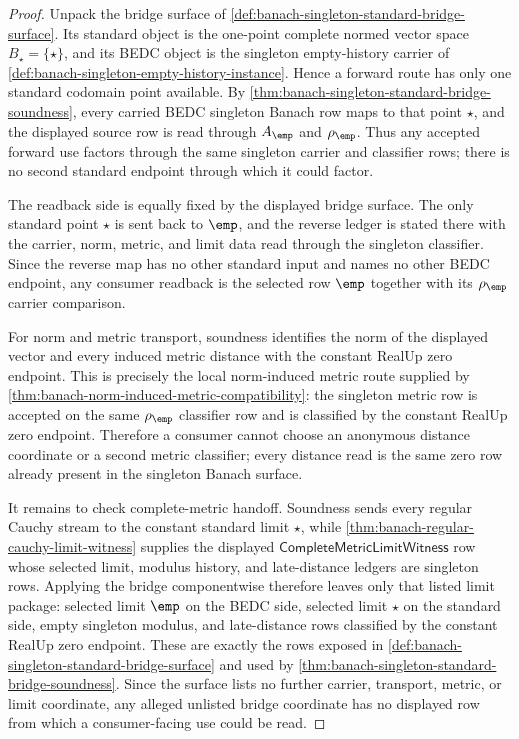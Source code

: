 \begin{proof}
Unpack the bridge surface of
\autoref{def:banach-singleton-standard-bridge-surface}. Its standard object is
the one-point complete normed vector space $B_{\star}=\{\star\}$, and its BEDC
object is the singleton empty-history carrier of
\autoref{def:banach-singleton-empty-history-instance}. Hence a forward route
has only one standard codomain point available. By
\autoref{thm:banach-singleton-standard-bridge-soundness}, every carried BEDC
singleton Banach row maps to that point $\star$, and the displayed source row is
read through $A_{\emp}$ and $\rho_{\emp}$. Thus any accepted forward use factors
through the same singleton carrier and classifier rows; there is no second
standard endpoint through which it could factor.

The readback side is equally fixed by the displayed bridge surface. The only
standard point $\star$ is sent back to $\emp$, and the reverse ledger is stated
there with the carrier, norm, metric, and limit data read through the singleton
classifier. Since the reverse map has no other standard input and names no
other BEDC endpoint, any consumer readback is the selected row $\emp$ together
with its $\rho_{\emp}$ carrier comparison.

For norm and metric transport, soundness identifies the norm of the displayed
vector and every induced metric distance with the constant RealUp zero endpoint.
This is precisely the local norm-induced metric route supplied by
\autoref{thm:banach-norm-induced-metric-compatibility}: the singleton metric row
is accepted on the same $\rho_{\emp}$ classifier row and is classified by the
constant RealUp zero endpoint. Therefore a consumer cannot choose an anonymous
distance coordinate or a second metric classifier; every distance read is the
same zero row already present in the singleton Banach surface.

It remains to check complete-metric handoff. Soundness sends every regular
Cauchy stream to the constant standard limit $\star$, while
\autoref{thm:banach-regular-cauchy-limit-witness} supplies the displayed
$\mathsf{CompleteMetricLimitWitness}$ row whose selected limit, modulus history,
and late-distance ledgers are singleton rows. Applying the bridge componentwise
therefore leaves only that listed limit package: selected limit $\emp$ on the
BEDC side, selected limit $\star$ on the standard side, empty singleton modulus,
and late-distance rows classified by the constant RealUp zero endpoint. These
are exactly the rows exposed in
\autoref{def:banach-singleton-standard-bridge-surface} and used by
\autoref{thm:banach-singleton-standard-bridge-soundness}. Since the surface
lists no further carrier, transport, metric, or limit coordinate, any alleged
unlisted bridge coordinate has no displayed row from which a consumer-facing use
could be read.
\end{proof}

